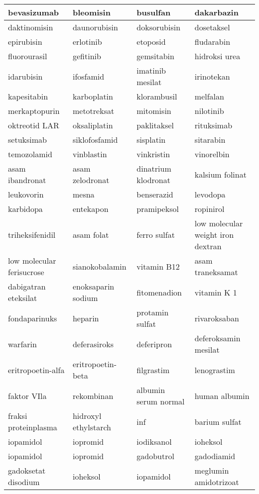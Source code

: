 \begin{longtable}{|p{}|p{}|p{}|p{}|}
	bevasizumab & bleomisin & busulfan & dakarbazin \\ \hline
	daktinomisin & daunorubisin & doksorubisin & dosetaksel \\ \hline
	epirubisin & erlotinib & etoposid & fludarabin \\ \hline
	fluorourasil & gefitinib & gemsitabin & hidroksi urea \\ \hline
	idarubisin & ifosfamid & imatinib mesilat & irinotekan \\ \hline
	kapesitabin & karboplatin & klorambusil & melfalan \\ \hline
	merkaptopurin & metotreksat & mitomisin & nilotinib \\ \hline
	oktreotid LAR & oksaliplatin & paklitaksel & rituksimab \\ \hline
	setuksimab & siklofosfamid & sisplatin & sitarabin \\ \hline
	temozolamid & vinblastin & vinkristin & vinorelbin \\ \hline
	asam ibandronat & asam zelodronat & dinatrium klodronat & kalsium folinat \\ \hline
	leukovorin & mesna & benserazid & levodopa \\ \hline
	karbidopa & entekapon & pramipeksol & ropinirol \\ \hline
	triheksifenidil & asam folat & ferro sulfat & low molecular weight iron dextran \\ \hline
	low molecular ferisucrose & sianokobalamin & vitamin B12 & asam traneksamat \\ \hline
	dabigatran eteksilat & enoksaparin sodium & fitomenadion & vitamin K 1 \\ \hline
	fondaparinuks & heparin & protamin sulfat & rivaroksaban \\ \hline
	warfarin & deferasiroks & deferipron & deferoksamin mesilat \\ \hline
	eritropoetin-alfa & eritropoetin-beta & filgrastim & lenograstim \\ \hline
	faktor VIla & rekombinan & albumin serum normal & human albumin \\ \hline
	fraksi proteinplasma & hidroxyl ethylstarch & inf & barium sulfat \\ \hline
	iopamidol & iopromid & iodiksanol & ioheksol \\ \hline
	iopamidol & iopromid & gadobutrol & gadodiamid \\ \hline
	gadoksetat disodium & ioheksol & iopamidol & meglumin amidotrizoat \\ \hline

\end{longtable}
